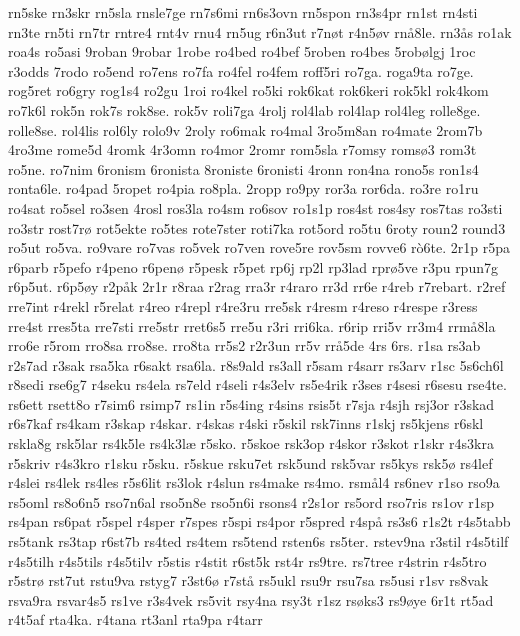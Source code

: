 rn5ske
rn3skr
rn5sla
rnsle7ge
rn7s6mi
rn6s3ovn
rn5spon
rn3s4pr
rn1st
rn4sti
rn3te
rn5ti
rn7tr
rntre4
rnt4v
rnu4
rn5ug
r6n3ut
r7n^^f8t
r4n5^^f8v
rn^^e58le.
rn3^^e5s
ro1ak
roa4s
ro5asi
9roban
9robar
1robe
ro4bed
ro4bef
5roben
ro4bes
5rob^^f8lgj
1roc
r3odds
7rodo
ro5end
ro7ens
ro7fa
ro4fel
ro4fem
roff5ri
ro7ga.
roga9ta
ro7ge.
rog5ret
ro6gry
rog1s4
ro2gu
1roi
ro4kel
ro5ki
rok6kat
rok6keri
rok5kl
rok4kom
ro7k6l
rok5n
rok7s
rok8se.
rok5v
roli7ga
4rolj
rol4lab
rol4lap
rol4leg
rolle8ge.
rolle8se.
rol4lis
rol6ly
rolo9v
2roly
ro6mak
ro4mal
3ro5m8an
ro4mate
2rom7b
4ro3me
rome5d
4romk
4r3omn
ro4mor
2romr
rom5sla
r7omsy
roms^^f83
rom3t
ro5ne.
ro7nim
6ronism
6ronista
8roniste
6ronisti
4ronn
ron4na
rono5s
ron1s4
ronta6le.
ro4pad
5ropet
ro4pia
ro8pla.
2ropp
ro9py
ror3a
ror6da.
ro3re
ro1ru
ro4sat
ro5sel
ro3sen
4rosl
ros3la
ro4sm
ro6sov
ro1s1p
ros4st
ros4sy
ros7tas
ro3sti
ro3str
rost7r^^f8
rot5ekte
ro5tes
rote7ster
roti7ka
rot5ord
ro5tu
6roty
roun2
round3
ro5ut
ro5va.
ro9vare
ro7vas
ro5vek
ro7ven
rove5re
rov5sm
rovve6
r^^f26te.
2r1p
r5pa
r6parb
r5pefo
r4peno
r6pen^^f8
r5pesk
r5pet
rp6j
rp2l
rp3lad
rpr^^f85ve
r3pu
rpun7g
r6p5ut.
r6p5^^f8y
r2p^^e5k
2r1r
r8raa
r2rag
rra3r
r4raro
rr3d
rr6e
r4reb
r7rebart.
r2ref
rre7int
r4rekl
r5relat
r4reo
r4repl
r4re3ru
rre5sk
r4resm
r4reso
r4respe
r3ress
rre4st
rres5ta
rre7sti
rre5str
rret6s5
rre5u
r3ri
rri6ka.
r6rip
rri5v
rr3m4
rrm^^e58la
rro6e
r5rom
rro8sa
rro8se.
rro8ta
rr5s2
r2r3un
rr5v
rr^^e55de
4rs
6rs.
r1sa
rs3ab
r2s7ad
r3sak
rsa5ka
r6sakt
rsa6la.
r8s9ald
rs3all
r5sam
r4sarr
rs3arv
r1sc
5s6ch6l
r8sedi
rse6g7
r4seku
rs4ela
rs7eld
r4seli
r4s3elv
rs5e4rik
r3ses
r4sesi
r6sesu
rse4te.
rs6ett
rsett8o
r7sim6
rsimp7
rs1in
r5s4ing
r4sins
rsis5t
r7sja
r4sjh
rsj3or
r3skad
r6s7kaf
rs4kam
r3skap
r4skar.
r4skas
r4ski
r5skil
rsk7inns
r1skj
rs5kjens
r6skl
rskla8g
rsk5lar
rs4k5le
rs4k3l^^e6
r5sko.
r5skoe
rsk3op
r4skor
r3skot
r1skr
r4s3kra
r5skriv
r4s3kro
r1sku
r5sku.
r5skue
rsku7et
rsk5und
rsk5var
rs5kys
rsk5^^f8
rs4lef
r4slei
rs4lek
rs4les
r5s6lit
rs3lok
r4slun
rs4make
rs4mo.
rsm^^e5l4
rs6nev
r1so
rso9a
rs5oml
rs8o6n5
rso7n6al
rso5n8e
rso5n6i
rsons4
r2s1or
rs5ord
rso7ris
rs1ov
r1sp
rs4pan
rs6pat
r5spel
r4sper
r7spes
r5spi
rs4por
r5spred
r4sp^^e5
rs3s6
r1s2t
r4s5tabb
rs5tank
rs3tap
r6st7b
rs4ted
rs4tem
rs5tend
rsten6s
rs5ter.
rstev9na
r3stil
r4s5tilf
r4s5tilh
r4s5tils
r4s5tilv
r5stis
r4stit
r6st5k
rst4r
rs9tre.
rs7tree
r4strin
r4s5tro
r5str^^f8
rst7ut
rstu9va
rstyg7
r3st6^^f8
r7st^^e5
rs5ukl
rsu9r
rsu7sa
rs5usi
r1sv
rs8vak
rsva9ra
rsvar4s5
rs1ve
r3s4vek
rs5vit
rsy4na
rsy3t
r1sz
rs^^f8ks3
rs9^^f8ye
6r1t
rt5ad
r4t5af
rta4ka.
r4tana
rt3anl
rta9pa
r4tarr
